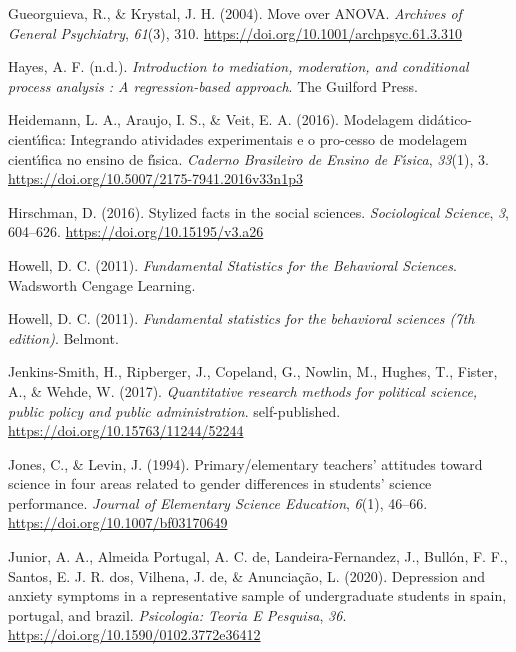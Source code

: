 \documentclass[
]{book}
\begin{document}
\leavevmode\hypertarget{ref-Gueorguieva2004}{}%
Gueorguieva, R., \& Krystal, J. H. (2004). Move over ANOVA.
\emph{Archives of General Psychiatry}, \emph{61}(3), 310.
\url{https://doi.org/10.1001/archpsyc.61.3.310}

\leavevmode\hypertarget{ref-hayes2013}{}%
Hayes, A. F. (n.d.). \emph{Introduction to mediation, moderation, and
conditional process analysis : A regression-based approach}. The
Guilford Press.

\leavevmode\hypertarget{ref-Heidemann2016}{}%
Heidemann, L. A., Araujo, I. S., \& Veit, E. A. (2016). Modelagem
didático-cientı́fica: Integrando atividades experimentais e o pro-cesso
de modelagem cientı́fica no ensino de fı́sica. \emph{Caderno Brasileiro de
Ensino de Fı́sica}, \emph{33}(1), 3.
\url{https://doi.org/10.5007/2175-7941.2016v33n1p3}

\leavevmode\hypertarget{ref-Hirschman2016}{}%
Hirschman, D. (2016). Stylized facts in the social sciences.
\emph{Sociological Science}, \emph{3}, 604--626.
\url{https://doi.org/10.15195/v3.a26}

\leavevmode\hypertarget{ref-Howell2011}{}%
Howell, D. C. (2011). \emph{Fundamental Statistics for the Behavioral
Sciences}. Wadsworth Cengage Learning.

\leavevmode\hypertarget{ref-howell2011}{}%
Howell, D. C. (2011). \emph{Fundamental statistics for the behavioral
sciences (7th edition)}. Belmont.

\leavevmode\hypertarget{ref-JenkinsSmith2017}{}%
Jenkins-Smith, H., Ripberger, J., Copeland, G., Nowlin, M., Hughes, T.,
Fister, A., \& Wehde, W. (2017). \emph{Quantitative research methods for
political science, public policy and public administration}.
self-published. \url{https://doi.org/10.15763/11244/52244}

\leavevmode\hypertarget{ref-Jones1994}{}%
Jones, C., \& Levin, J. (1994). Primary/elementary teachers' attitudes
toward science in four areas related to gender differences in students'
science performance. \emph{Journal of Elementary Science Education},
\emph{6}(1), 46--66. \url{https://doi.org/10.1007/bf03170649}

\leavevmode\hypertarget{ref-AfonsoJunior2020}{}%
Junior, A. A., Almeida Portugal, A. C. de, Landeira-Fernandez, J.,
Bullón, F. F., Santos, E. J. R. dos, Vilhena, J. de, \& Anunciação, L.
(2020). Depression and anxiety symptoms in a representative sample of
undergraduate students in spain, portugal, and brazil. \emph{Psicologia:
Teoria E Pesquisa}, \emph{36}.
\url{https://doi.org/10.1590/0102.3772e36412}
\end{document}
